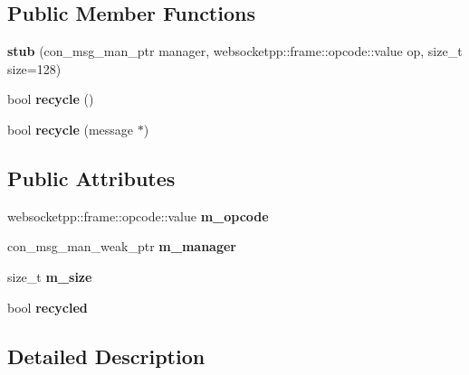 \subsection*{Public Member Functions}
\begin{DoxyCompactItemize}
\item 
{\bfseries stub} (con\+\_\+msg\+\_\+man\+\_\+ptr manager, websocketpp\+::frame\+::opcode\+::value op, size\+\_\+t size=128)\hypertarget{structstub_a3597f164543502f6894f79ef3ec35046}{}\label{structstub_a3597f164543502f6894f79ef3ec35046}

\item 
bool {\bfseries recycle} ()\hypertarget{structstub_accf91b8d6c3a0932e8c5ad7870eb934a}{}\label{structstub_accf91b8d6c3a0932e8c5ad7870eb934a}

\item 
bool {\bfseries recycle} (message $\ast$)\hypertarget{structstub_aef03fdad19f7d5a7cded40f887904d36}{}\label{structstub_aef03fdad19f7d5a7cded40f887904d36}

\end{DoxyCompactItemize}
\subsection*{Public Attributes}
\begin{DoxyCompactItemize}
\item 
websocketpp\+::frame\+::opcode\+::value {\bfseries m\+\_\+opcode}\hypertarget{structstub_a8d624b79f08779c30393ed271bde1e69}{}\label{structstub_a8d624b79f08779c30393ed271bde1e69}

\item 
con\+\_\+msg\+\_\+man\+\_\+weak\+\_\+ptr {\bfseries m\+\_\+manager}\hypertarget{structstub_a73f039832d3d871cd50247d50ce9f7ce}{}\label{structstub_a73f039832d3d871cd50247d50ce9f7ce}

\item 
size\+\_\+t {\bfseries m\+\_\+size}\hypertarget{structstub_abc19064870de3d4c3e94cec750b55afa}{}\label{structstub_abc19064870de3d4c3e94cec750b55afa}

\item 
bool {\bfseries recycled}\hypertarget{structstub_a6dc1e6ab4823fdba8b071343904459f8}{}\label{structstub_a6dc1e6ab4823fdba8b071343904459f8}

\end{DoxyCompactItemize}


\subsection{Detailed Description}
